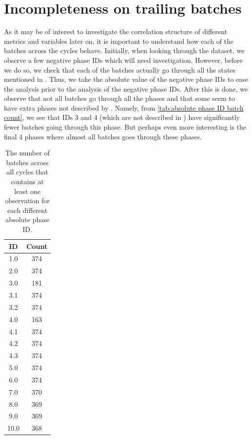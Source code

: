 \documentclass[../Thesis.tex]{subfiles}
\begin{document}
\section{Incompleteness on trailing batches}
As it may be of interest to investigate the correlation structure of different metrics and variables later on, it is important to understand how each of the batches across the cycles behave. Initially, when looking through the dataset, we observe a few negative phase IDs which will need investigation. However, before we do so, we check that each of the batches actually go through all the states mentioned in \cite{benchmark-model-to-generate-batch-process-data}. Thus, we take the absolute value of the negative phase IDs to ease the analysis prior to the analysis of the negative phase IDs. After this is done, we observe that not all batches go through all the phases and that some seem to have extra phases not described by \cite{benchmark-model-to-generate-batch-process-data}. Namely, from \autoref{tab:absolute phase ID batch count}, we see that IDs 3 and 4 (which are not described in \cite{benchmark-model-to-generate-batch-process-data}) have significantly fewer batches going through this phase. But perhaps even more interesting is the final 4 phases where almost all batches goes through these phases.

\begin{table}[h]
    \centering
    \begin{tabular}{c|c}
        ID   & Count \\\hline
        1.0  & 374   \\
        2.0  & 374   \\
        3.0  & 181   \\
        3.1  & 374   \\
        3.2  & 374   \\
        4.0  & 163   \\
        4.1  & 374   \\
        4.2  & 374   \\
        4.3  & 374   \\
        5.0  & 374   \\
        6.0  & 374   \\
        7.0  & 370   \\
        8.0  & 369   \\
        9.0  & 369   \\
        10.0 & 368
    \end{tabular}
    \caption{The number of batches across all cycles that contains at least one observation for each different absolute phase ID.}
    \label{tab:absolute phase ID batch count}
\end{table}
\end{document}
